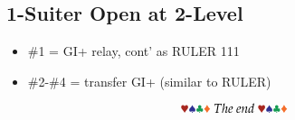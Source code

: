 \documentclass{article}
\begin{document}
\begin{multicols}{2}
\begin{CJK*}{UTF8}{gt}
\subsection{1-Suiter Open at 2-Level}\label{sec:1suit}
\begin{itemize}
    \item \#1 = GI+ relay, cont' as RULER 111
    \item \#2-\#4 = transfer GI+ (similar to RULER)
\end{itemize}

\columnbreak
$$\hhh\sss\ccc\ddd~The~end~\hhh\sss\ccc\ddd$$

\end{CJK*}
\end{multicols}
\end{document}
